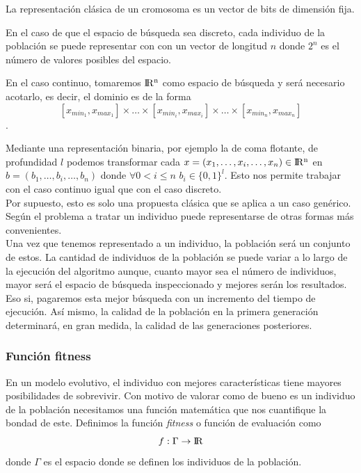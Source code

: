\documentclass[12pt,a4paper]{article}
\begin{document}
			La representaci\'on cl\'asica de un cromosoma es un vector de bits de dimensi\'on fija. 
			
			En el caso de que el espacio de b\'usqueda sea discreto, cada individuo de la poblaci\'on se puede representar con con un vector de longitud $n$ donde $2^n$ es el n\'umero de valores posibles del espacio.
			
			En el caso continuo, tomaremos ${\rm I\!R^n}$ como espacio de b\'usqueda y ser\'a necesario acotarlo, es decir, el dominio es de la forma \\
			\[[x_{min_1}, x_{max_1}]\times\dots\times[x_{min_i},x_{max_i}]\times\dots\times[x_{min_n},x_{max_n}]\]. 
			
			Mediante una representaci\'on binaria, por ejemplo la de coma flotante, de profundidad $l$ podemos transformar cada $x=(x_1,\dots,x_i,\dots,x_n) \in {\rm I\!R^n}$ en $b=(b_1,\dots,b_i,\dots,b_n)$ donde $\forall  0<i\leq n$ $b_i \in \{0,1\}^l$. Esto nos permite trabajar con el caso continuo igual que con el caso discreto.\\
			
			Por supuesto, esto es solo una propuesta cl\'asica que se aplica a un caso gen\'erico. Seg\'un el problema a tratar un individuo puede representarse de otras formas m\'as convenientes.\\
			
			Una vez que tenemos representado a un individuo, la poblaci\'on ser\'a un conjunto de estos. La cantidad de individuos de la poblaci\'on se puede variar a lo largo de la ejecuci\'on del algoritmo aunque, cuanto mayor sea el n\'umero de individuos, mayor ser\'a el espacio de b\'usqueda inspeccionado y mejores ser\'an los resultados. Eso si, pagaremos esta mejor b\'usqueda con un incremento del tiempo de ejecuci\'on. As\'i mismo, la calidad de la poblaci\'on en la primera generaci\'on determinar\'a, en gran medida, la calidad de las generaciones posteriores.
				
			\subsubsection{Funci\'on fitness}
			En un modelo evolutivo, el individuo con mejores caracter\'isticas tiene mayores posibilidades de sobrevivir. Con motivo de valorar como de bueno es un individuo de la poblaci\'on necesitamos una funci\'on matem\'atica que nos cuantifique la bondad de este. Definimos la funci\'on \textit{fitness} o funci\'on de evaluaci\'on como 
			\[f:\Gamma\rightarrow{\rm I\!R}\]
			donde $\Gamma$ es el espacio donde se definen los individuos de la poblaci\'on.\\
			
\end{document}
